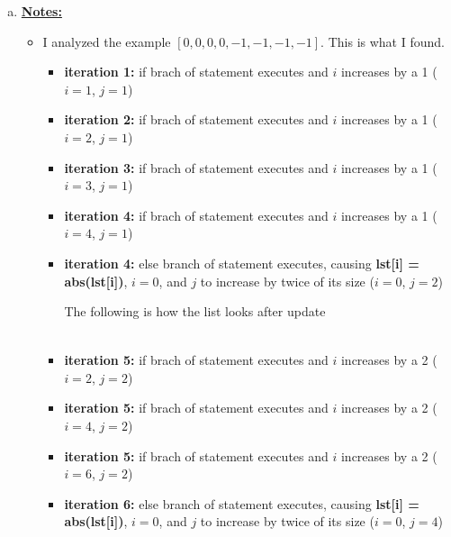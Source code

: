 \documentclass[12pt]{article}
\begin{document}
\begin{enumerate}[a.]
    \item

    \underline{\textbf{Notes:}}

    \bigskip

    \begin{itemize}
        \item

        I analyzed the example $[0,0,0,0,-1,-1,-1,-1]$. This is what I found.

        \bigskip

        \begin{itemize}
            \item \textbf{iteration 1:} if brach of statement executes and $i$ increases
            by a 1 ($i = 1$, $j = 1$)
            \item \textbf{iteration 2:} if brach of statement executes and $i$ increases
            by a 1 ($i = 2$, $j = 1$)
            \item \textbf{iteration 3:} if brach of statement executes and $i$ increases
            by a 1 ($i = 3$, $j = 1$)
            \item \textbf{iteration 4:} if brach of statement executes and $i$ increases
            by a 1 ($i = 4$, $j = 1$)
            \item \textbf{iteration 4:} else branch of statement executes, causing
            \textbf{lst[i] = abs(lst[i])}, $i = 0$, and $j$ to increase by twice of its size ($i = 0$, $j = 2$)

            \bigskip

            The following is how the list looks after update

            \begin{align*}
                [0,0,0,0,1,-1,-1,-1]
            \end{align*}

            \item \textbf{iteration 5:} if brach of statement executes and $i$ increases
            by a 2 ($i = 2$, $j = 2$)
            \item \textbf{iteration 5:} if brach of statement executes and $i$ increases
            by a 2 ($i = 4$, $j = 2$)
            \item \textbf{iteration 5:} if brach of statement executes and $i$ increases
            by a 2 ($i = 6$, $j = 2$)

            \item \textbf{iteration 6:} else branch of statement executes, causing
            \textbf{lst[i] = abs(lst[i])}, $i = 0$, and $j$ to increase by twice of its size ($i = 0$, $j = 4$)


\end{itemize}
\end{itemize}
\end{enumerate}
\end{document}
